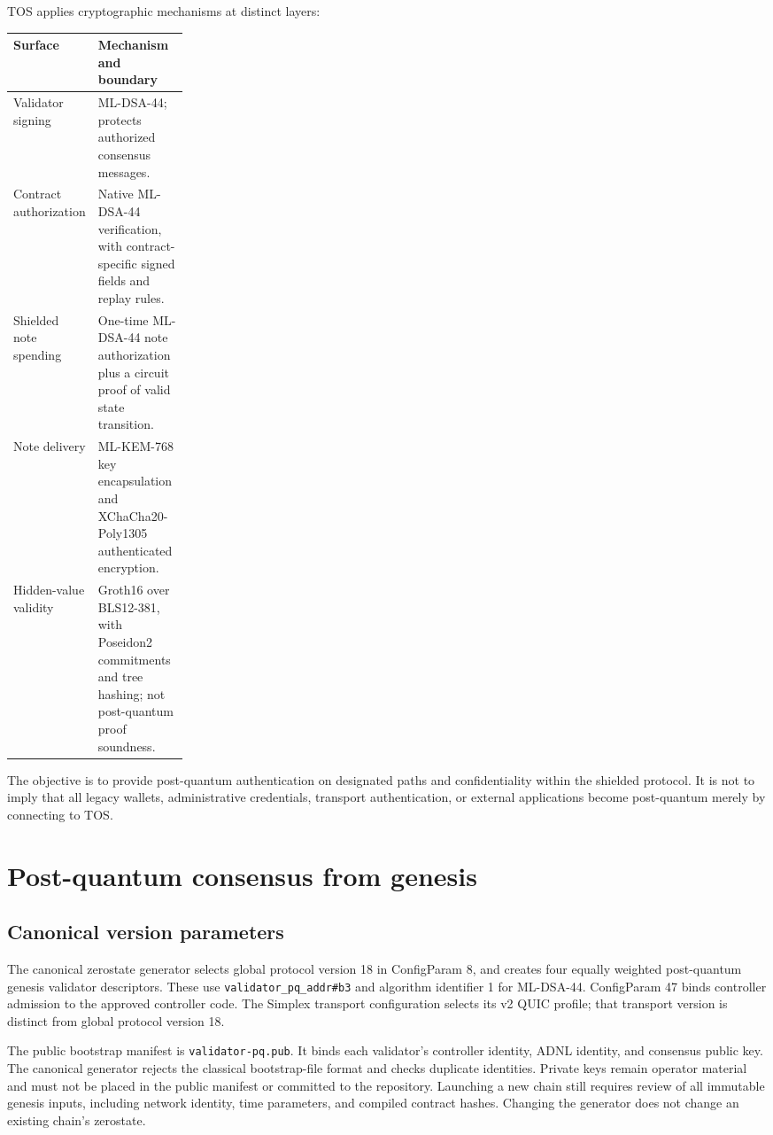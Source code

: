 \documentclass[11pt,a4paper]{article}
\newcommand{\code}[1]{\texttt{#1}}
\begin{document}
TOS applies cryptographic mechanisms at distinct layers:
\begin{center}
\small
\begin{tabularx}{\linewidth}{@{}p{0.23\linewidth}X@{}}
\toprule
Surface & Mechanism and boundary \\
\midrule
Validator signing & ML-DSA-44; protects authorized consensus messages. \\
Contract authorization & Native ML-DSA-44 verification, with contract-specific signed fields and replay rules. \\
Shielded note spending & One-time ML-DSA-44 note authorization plus a circuit proof of valid state transition. \\
Note delivery & ML-KEM-768 key encapsulation and XChaCha20-Poly1305 authenticated encryption. \\
Hidden-value validity & Groth16 over BLS12-381, with Poseidon2 commitments and tree hashing; not post-quantum proof soundness. \\
\bottomrule
\end{tabularx}
\end{center}
The objective is to provide post-quantum authentication on designated paths
and confidentiality within the shielded protocol. It is not to imply that
all legacy wallets, administrative credentials, transport authentication, or
external applications become post-quantum merely by connecting to TOS.

\section{Post-quantum consensus from genesis}
\subsection{Canonical version parameters}
The canonical zerostate generator selects global protocol version 18 in
ConfigParam 8, and creates four equally weighted post-quantum genesis
validator descriptors. These use \code{validator\_pq\_addr\#b3} and algorithm
identifier 1 for ML-DSA-44. ConfigParam 47 binds controller admission to the
approved controller code. The Simplex transport configuration selects its
v2 QUIC profile; that transport version is distinct from global protocol
version 18.

The public bootstrap manifest is \code{validator-pq.pub}. It binds each
validator's controller identity, ADNL identity, and consensus public key.
The canonical generator rejects the classical bootstrap-file format and
checks duplicate identities. Private keys remain operator material and must
not be placed in the public manifest or committed to the repository.
Launching a new chain still requires review of all immutable genesis inputs,
including network identity, time parameters, and compiled contract hashes.
Changing the generator does not change an existing chain's zerostate.
\end{document}

